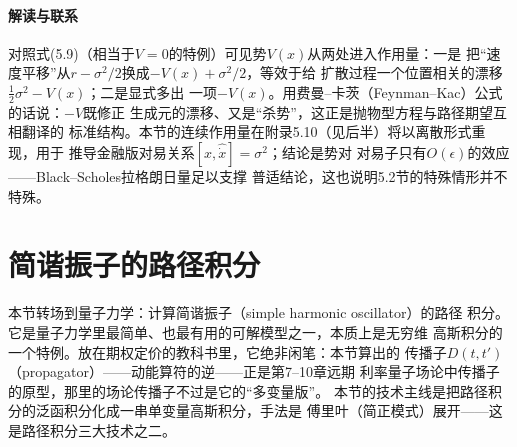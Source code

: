 \paragraph{解读与联系}
对照式(5.9)（相当于$V=0$的特例）可见势$V(x)$从两处进入作用量：一是
把“速度平移”从$r-\sigma^{2}/2$换成$-V(x)+\sigma^{2}/2$，等效于给
扩散过程一个位置相关的漂移$\frac{1}{2}\sigma^{2}-V(x)$；二是显式多出
一项$-V(x)$。用费曼--卡茨（Feynman--Kac）公式的话说：$-V$既修正
生成元的漂移、又是“杀势”，这正是抛物型方程与路径期望互相翻译的
标准结构。本节的连续作用量在附录5.10（见后半）将以离散形式重现，用于
推导金融版对易关系$[\hat{x},\hat{\dot{x}}]=\sigma^{2}$；结论是势对
对易子只有$O(\epsilon)$的效应——Black--Scholes拉格朗日量足以支撑
普适结论，这也说明5.2节的特殊情形并不特殊。

\section{简谐振子的路径积分}

本节转场到量子力学：计算简谐振子（simple harmonic oscillator）的路径
积分。它是量子力学里最简单、也最有用的可解模型之一，本质上是无穷维
高斯积分的一个特例。放在期权定价的教科书里，它绝非闲笔：本节算出的
传播子$D(t,t')$（propagator）——动能算符的逆——正是第7--10章远期
利率量子场论中传播子的原型，那里的场论传播子不过是它的“多变量版”。
本节的技术主线是把路径积分的泛函积分化成一串单变量高斯积分，手法是
傅里叶（简正模式）展开——这是路径积分三大技术之二。

